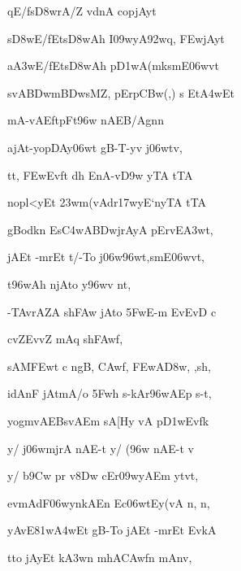 {\dn qE/\2fs\3D8wrA/\?Z v\?dnA copjAyt\? \vegdn\dontdisplaylinenum}

{\dn s\3D8wE/\2fEts\3D8wAh\? I\309wyA\0\392w\?q, \3FEwjAyt\?{\dandabdn} \dontdisplaylinenum}

{\dn a\3A3wE/\2fEts\3D8wAh\? p\3D1wA(mksmE\306wvt \vegdn\dontdisplaylinenum}

{\dn svA\0\3BDwm\3BDwsMZ\0, pErp\3CBw{\rs (\re},{\rs )\re} s Et\3A4wEt{\dandabdn} \dontdisplaylinenum}

{\dn mA-vAEftpFt\396w nAEB/Agn\?n  \vegdn\dontdisplaylinenum}

{\dn ajAt-yopDAy\0\306wt\? gB\0-T-y\4v j\306wtv,{\dandabdn} \dontdisplaylinenum}

{\dn tt, \3FEwEvft\? d\?h\? EnA-v\3D9w yTA tTA \vegdn\dontdisplaylinenum}

{\dn nopl<yEt \323wm(vAdr\317wyE`ny\0TA tTA{\dandabdn} \dontdisplaylinenum}

{\dn gBo{\qvb}dk\?n Es\3C4wA\3BDwjrAyA pErv\?E\3A3wt, \vegdn\dontdisplaylinenum}

{\dn jAEt -mrEt t/-To j\306w\396w\?t,smE\306wvt,{\dandabdn} \dontdisplaylinenum}

{\dn {}t\396wAh\2 njA\0to y\396w\4v n\0t, \vegdn\dontdisplaylinenum}

{\dn -TAvrAZA\2 sh\3FAw\? jAto \35FwE-m EvEvD\? c{\dandabdn} \dontdisplaylinenum}

{\dn cv\0Z\0EvvZ\?{\qvb} mAq\? sh\3FAwf, \vegdn\dontdisplaylinenum}

{\dn sAM\3FEwt\2 c ng\0B\0, \3CAw\?f, \3FEwA\3D8w, ,sh,{\dandabdn} \dontdisplaylinenum}

{\dn idAnF{\qva} jAtmA/o \35Fwh\2 s\2-kAr\4\396wAEp s\2-t, \vegdn\dontdisplaylinenum}

{\dn yogm\?vAEBs\?vAEm sA{\rs [\re}\2{\rs ]\re}Hy\2 vA p\3D1wEv\2fk \dontdisplaylinenum}

{\dn y/ j\306wmjrA nAE-t y/ (\396w nAE-t v\4 \vegdn\dontdisplaylinenum}

{\dn y/ b\5\39Cw pr\2 v\?\38Dw\2 cEr\309wyAEm ytv\5t,{\dandabdn} \dontdisplaylinenum}

{\dn evmAdF\306wyn\?kAEn Ec\306wtEy(vA n, n, \vegdn\dontdisplaylinenum}

{\dn yAvE\381w\3A4wEt gB\0-To jAEt -mrEt Ev\0kA \dontdisplaylinenum}

{\dn tto jAyEt k\3A3w\?n mhA\3CAw\?f\?n mAnv, \vegdn\dontdisplaylinenum}

